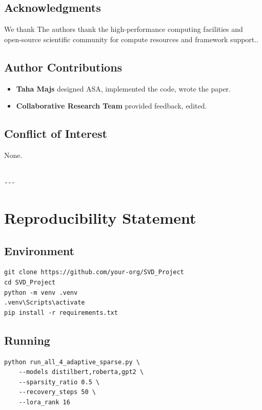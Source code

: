 \subsection{Acknowledgments}

We thank The authors thank the high-performance computing facilities and open-source scientific community for compute resources and framework support..

\subsection{Author Contributions}

\begin{itemize}
\item \textbf{Taha Majs} designed ASA, implemented the code, wrote the paper.
\item \textbf{Collaborative Research Team} provided feedback, edited.

\end{itemize}
\subsection{Conflict of Interest}

None.
\begin{lstlisting}

---
\end{lstlisting}


\section{Reproducibility Statement}

\subsection{Environment}

\begin{lstlisting}
git clone https://github.com/your-org/SVD_Project
cd SVD_Project
python -m venv .venv
.venv\Scripts\activate
pip install -r requirements.txt
\end{lstlisting}

\subsection{Running}

\begin{lstlisting}
python run_all_4_adaptive_sparse.py \
    --models distilbert,roberta,gpt2 \
    --sparsity_ratio 0.5 \
    --recovery_steps 50 \
    --lora_rank 16
\end{lstlisting}

